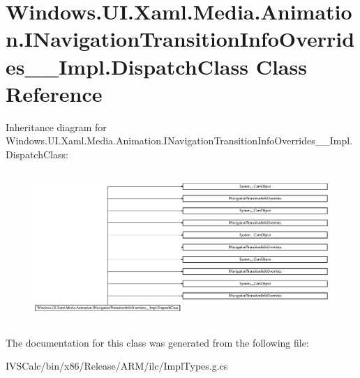\hypertarget{class_windows_1_1_u_i_1_1_xaml_1_1_media_1_1_animation_1_1_i_navigation_transition_info_overrides_____impl_1_1_dispatch_class}{}\section{Windows.\+U\+I.\+Xaml.\+Media.\+Animation.\+I\+Navigation\+Transition\+Info\+Overrides\+\_\+\+\_\+\+Impl.\+Dispatch\+Class Class Reference}
\label{class_windows_1_1_u_i_1_1_xaml_1_1_media_1_1_animation_1_1_i_navigation_transition_info_overrides_____impl_1_1_dispatch_class}
Inheritance diagram for Windows.\+U\+I.\+Xaml.\+Media.\+Animation.\+I\+Navigation\+Transition\+Info\+Overrides\+\_\+\+\_\+\+Impl.\+Dispatch\+Class\+:\begin{figure}[H]
\begin{center}
\leavevmode
\includegraphics[height=5.757010cm]{class_windows_1_1_u_i_1_1_xaml_1_1_media_1_1_animation_1_1_i_navigation_transition_info_overrides_____impl_1_1_dispatch_class}
\end{center}
\end{figure}


The documentation for this class was generated from the following file\+:\begin{DoxyCompactItemize}
\item 
I\+V\+S\+Calc/bin/x86/\+Release/\+A\+R\+M/ilc/Impl\+Types.\+g.\+cs\end{DoxyCompactItemize}
